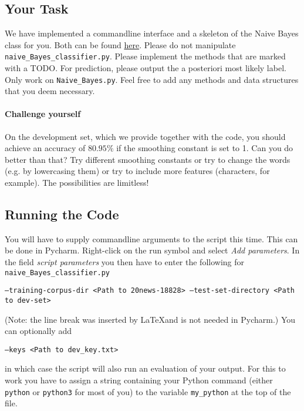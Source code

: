 \documentclass[11pt, leqno, a4paper]{article}
\begin{document}
\subsection{Your Task}
We have implemented a commandline interface and a skeleton of the Naive Bayes class for you. Both can be 
found \href{https://github.com/BasicProbability/BasicProbability.github.io/raw/master/Homework/Programming/2016-17/Assignment4/prerequisites.zip}{here}. Please do not manipulate \texttt{naive\_Bayes\_classifier.py}. Please implement the methods that are marked with a TODO. For prediction, please output the 
a posteriori most likely label. Only work on 
\texttt{Naive\_Bayes.py}. Feel free to add any methods and data structures that you deem necessary.

\paragraph{Challenge yourself} On the development set, which we provide together with the code, you
should achieve an accuracy of $ 80.95\% $ if the smoothing constant is set to 1. Can you do better
than that? Try different smoothing constants or try to change the words (e.g. by lowercasing them) or
try to include more features (characters, for example). The possibilities are limitless! 

\subsection{Running the Code}
You will have to supply commandline arguments to the script this time. This can be done in Pycharm. 
Right-click on the run symbol and select \textit{Add parameters}. In the field \textit{script parameters}
you then have to enter the following for \texttt{naive\_Bayes\_classifier.py}
\begin{center}
\texttt{--training-corpus-dir <Path to 20news-18828> --test-set-directory <Path to dev-set>}
\end{center}
(Note: the line break was inserted by \LaTeX and is not needed in Pycharm.)
You can optionally add
\begin{center}
\texttt{--keys <Path to dev\_key.txt>}
\end{center}
in which case the script will also run an evaluation of your output. For this to work you have to assign
a string containing your Python command (either \texttt{python} or \texttt{python3} for most of you)
to the variable \texttt{my\_python} at the top of the file.
\end{document}
